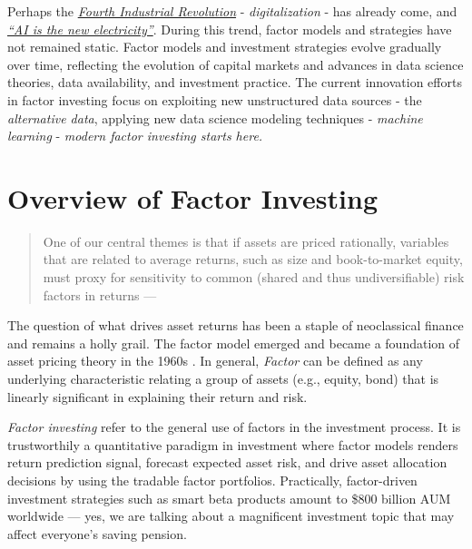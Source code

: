 \documentclass[
]{book}
\begin{document}
Perhaps the \emph{\href{https://www.weforum.org/agenda/2016/01/the-fourth-industrial-revolution-what-it-means-and-how-to-respond/}{Fourth Industrial Revolution}} - {\emph{digitalization}} - has already come, and \emph{\href{https://www.gsb.stanford.edu/insights/andrew-ng-why-ai-new-electricity}{``AI is the new electricity''}}. During this trend, factor models and strategies have not remained static. Factor models and investment strategies evolve gradually over time, reflecting the evolution of capital markets and advances in data science theories, data availability, and investment practice. The current innovation efforts in factor investing focus on exploiting new unstructured data sources - the {\emph{alternative data}}, applying new data science modeling techniques - {\emph{machine learning}} - \emph{{modern factor investing} starts here.}

\hypertarget{overview-of-factor-investing}{%
\section{Overview of Factor Investing}\label{overview-of-factor-investing}}

\begin{quote}
One of our central themes is that if assets are priced rationally, variables that are related to average returns, such as size and book-to-market equity, must proxy for sensitivity to common (shared and thus undiversifiable) risk factors in returns --- \citet{fama1993common}
\end{quote}

The question of what drives asset returns has been a staple of neoclassical finance and remains a holly grail. The factor model emerged and became a foundation of asset pricing theory in the 1960s \citetext{\citealp{lintner1969valuation}; \citealp{mossin1966equilibrium}; \citealp{sharpe1964capital}; \citealp[and][]{treynor1961toward}}. In general, {\emph{Factor}} can be defined as any underlying characteristic relating a group of assets (e.g., equity, bond) that is linearly significant in explaining their return and risk.

{\emph{Factor investing}} refer to the general use of factors in the investment process. It is trustworthily a quantitative paradigm in investment where factor models renders return prediction signal, forecast expected asset risk, and drive asset allocation decisions by using the tradable factor portfolios. Practically, factor-driven investment strategies such as smart beta products amount to \$800 billion AUM worldwide \citep{johnson2018etf} --- yes, we are talking about a magnificent investment topic that may affect everyone's saving pension.
\end{document}
